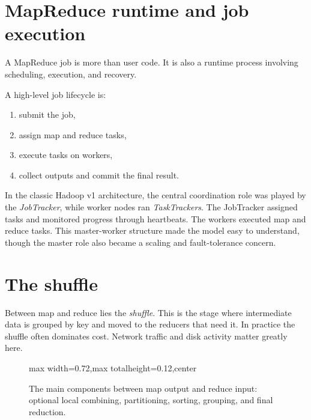 \documentclass[11pt,a4paper,openany]{book}
\begin{document}
\section{MapReduce runtime and job execution}
A MapReduce job is more than user code. It is also a runtime process involving scheduling, execution, and recovery.

A high-level job lifecycle is:
\begin{enumerate}
\item submit the job,
\item assign map and reduce tasks,
\item execute tasks on workers,
\item collect outputs and commit the final result.
\end{enumerate}

In the classic Hadoop v1 architecture, the central coordination role was played by the \emph{JobTracker}, while worker nodes ran \emph{TaskTrackers}. The JobTracker assigned tasks and monitored progress through heartbeats. The workers executed map and reduce tasks. This master-worker structure made the model easy to understand, though the master role also became a scaling and fault-tolerance concern.

\section{The shuffle}
Between map and reduce lies the \emph{shuffle}. This is the stage where intermediate data is grouped by key and moved to the reducers that need it. In practice the shuffle often dominates cost. Network traffic and disk activity matter greatly here.

\begin{figure}[tbp]
\centering
\begin{adjustbox}{max width=0.72\linewidth,max totalheight=0.12\textheight,center}
\end{adjustbox}
\caption{The main components between map output and reduce input: optional local combining, partitioning, sorting, grouping, and final reduction.}
\label{fig:shuffle-components}
\end{figure}
\end{document}
